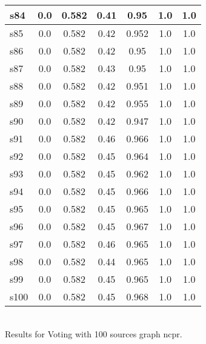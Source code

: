 \documentclass{article}
\begin{document}
\begin{tabular}{|l|c|c|c|c|c|c|}
\hline
s84 &0.0 & 0.582 & 0.41 & 0.95 & 1.0 & 1.0\\
\hline
s85 &0.0 & 0.582 & 0.42 & 0.952 & 1.0 & 1.0\\
\hline
s86 &0.0 & 0.582 & 0.42 & 0.95 & 1.0 & 1.0\\
\hline
s87 &0.0 & 0.582 & 0.43 & 0.95 & 1.0 & 1.0\\
\hline
s88 &0.0 & 0.582 & 0.42 & 0.951 & 1.0 & 1.0\\
\hline
s89 &0.0 & 0.582 & 0.42 & 0.955 & 1.0 & 1.0\\
\hline
s90 &0.0 & 0.582 & 0.42 & 0.947 & 1.0 & 1.0\\
\hline
s91 &0.0 & 0.582 & 0.46 & 0.966 & 1.0 & 1.0\\
\hline
s92 &0.0 & 0.582 & 0.45 & 0.964 & 1.0 & 1.0\\
\hline
s93 &0.0 & 0.582 & 0.45 & 0.962 & 1.0 & 1.0\\
\hline
s94 &0.0 & 0.582 & 0.45 & 0.966 & 1.0 & 1.0\\
\hline
s95 &0.0 & 0.582 & 0.45 & 0.965 & 1.0 & 1.0\\
\hline
s96 &0.0 & 0.582 & 0.45 & 0.967 & 1.0 & 1.0\\
\hline
s97 &0.0 & 0.582 & 0.46 & 0.965 & 1.0 & 1.0\\
\hline
s98 &0.0 & 0.582 & 0.44 & 0.965 & 1.0 & 1.0\\
\hline
s99 &0.0 & 0.582 & 0.45 & 0.965 & 1.0 & 1.0\\
\hline
s100 &0.0 & 0.582 & 0.45 & 0.968 & 1.0 & 1.0\\
\hline
\end{tabular}\\

\noindent Results for Voting with 100 sources graph ncpr.
\end{document}
